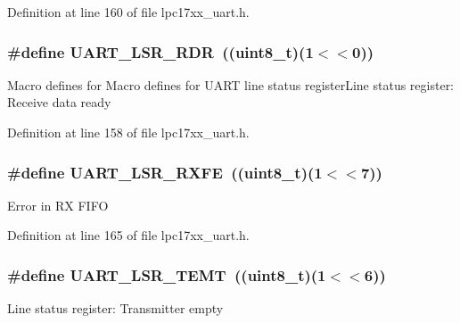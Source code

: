 \-Definition at line 160 of file lpc17xx\-\_\-uart.\-h.

\hypertarget{group___u_a_r_t___private___macros_ga3d83de31d722cd373ee69a2a38aaed43}{
\subsubsection[{\-U\-A\-R\-T\-\_\-\-L\-S\-R\-\_\-\-R\-D\-R}]{\setlength{\rightskip}{0pt plus 5cm}\#define {\bf \-U\-A\-R\-T\-\_\-\-L\-S\-R\-\_\-\-R\-D\-R}~((uint8\-\_\-t)(1$<$$<$0))}}\label{group___u_a_r_t___private___macros_ga3d83de31d722cd373ee69a2a38aaed43}
\-Macro defines for \-Macro defines for \-U\-A\-R\-T line status register\-Line status register\-: \-Receive data ready 

\-Definition at line 158 of file lpc17xx\-\_\-uart.\-h.

\hypertarget{group___u_a_r_t___private___macros_ga5972ac77db6249142b482356427dcf7c}{
\subsubsection[{\-U\-A\-R\-T\-\_\-\-L\-S\-R\-\_\-\-R\-X\-F\-E}]{\setlength{\rightskip}{0pt plus 5cm}\#define {\bf \-U\-A\-R\-T\-\_\-\-L\-S\-R\-\_\-\-R\-X\-F\-E}~((uint8\-\_\-t)(1$<$$<$7))}}\label{group___u_a_r_t___private___macros_ga5972ac77db6249142b482356427dcf7c}
\-Error in \-R\-X \-F\-I\-F\-O 

\-Definition at line 165 of file lpc17xx\-\_\-uart.\-h.

\hypertarget{group___u_a_r_t___private___macros_gadb3f8bb82f0a253700fdb88d8c609710}{
\subsubsection[{\-U\-A\-R\-T\-\_\-\-L\-S\-R\-\_\-\-T\-E\-M\-T}]{\setlength{\rightskip}{0pt plus 5cm}\#define {\bf \-U\-A\-R\-T\-\_\-\-L\-S\-R\-\_\-\-T\-E\-M\-T}~((uint8\-\_\-t)(1$<$$<$6))}}\label{group___u_a_r_t___private___macros_gadb3f8bb82f0a253700fdb88d8c609710}
\-Line status register\-: \-Transmitter empty 

